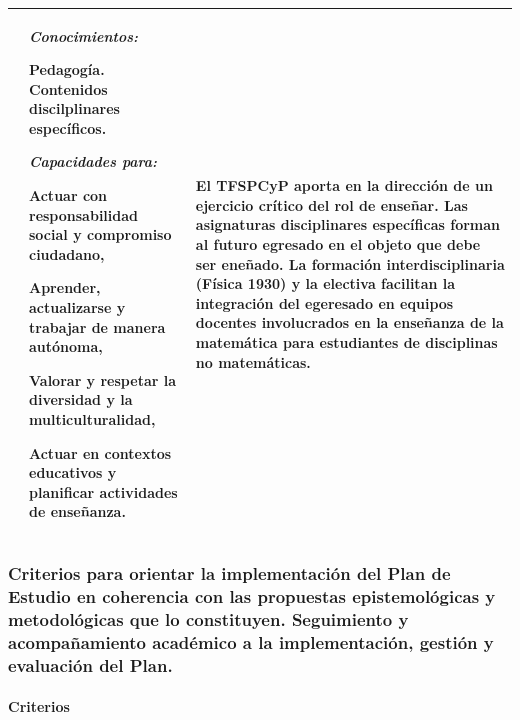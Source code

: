 \documentclass[a4paper, 12pt]{article}
\begin{document}
\begin{center}
\begin{tabularx}{1.0\textwidth}{|>{\raggedright\arraybackslash}X |
>{\raggedright\arraybackslash}X |
>{\raggedright\arraybackslash}X |
}
  & 
     \emph{Conocimientos:}
   
   Pedagogía.  Contenidos discilplinares específicos. 
   
   
   
   
   
   \emph{Capacidades para:}
  
   Actuar con responsabilidad social y compromiso ciudadano,
   
 Aprender, actualizarse y trabajar de manera autónoma,
 

 Valorar y respetar la diversidad y la multiculturalidad,
 
 
 Actuar en contextos educativos y planificar actividades de enseñanza.

  
  
  &  El TFSPCyP aporta en la dirección de un ejercicio crítico del rol de enseñar. Las asignaturas disciplinares específicas forman al futuro egresado en el objeto que debe ser eneñado. La formación interdisciplinaria (Física 1930) y la electiva  facilitan la integración del egeresado en equipos docentes involucrados en la enseñanza de la matemática para estudiantes de disciplinas no matemáticas. \\ \hline
\end{tabularx}
\end{center}
\normalsize


\subsubsection{Criterios para orientar la implementación del Plan de Estudio en coherencia con las propuestas epistemológicas y metodológicas que lo constituyen. Seguimiento y acompañamiento académico a la implementación, gestión y evaluación del Plan.
} 

\paragraph{Criterios}
\end{document}
